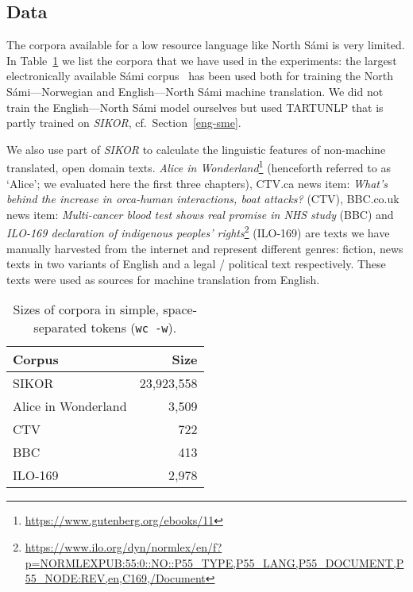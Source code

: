 \documentclass{flammie}
\begin{document}
\subsection{Data}

The corpora available for a low resource language like North Sámi is very
limited.  In Table~\ref{tab:corpus-sizes} we list the corpora that we have used
in the experiments: the largest electronically available Sámi
corpus~\cite{sikor_06.11.2018} has been used both for training the North
Sámi---Norwegian and English---North Sámi machine translation. We did not train
the English---North Sámi model ourselves but used TARTUNLP that is partly
trained on \textit{SIKOR}, cf.\ Section~\ref{eng-sme}.

We also use part of  \textit{SIKOR} to calculate the linguistic features of
non-machine translated, open domain texts. \textit{Alice in
Wonderland}\footnote{\url{https://www.gutenberg.org/ebooks/11}} (henceforth
referred to as `Alice'; we evaluated here the first three chapters), CTV.ca news
item: \textit{What's behind the increase in orca-human interactions, boat
attacks?} (CTV), BBC.co.uk news item: \textit{Multi-cancer blood test shows real
promise in NHS study} (BBC) and \textit{ILO-169 declaration of indigenous
peoples'
rights}\footnote{\url{https://www.ilo.org/dyn/normlex/en/f?p=NORMLEXPUB:55:0::NO::P55_TYPE,P55_LANG,P55_DOCUMENT,P55_NODE:REV,en,C169,/Document}}
(ILO-169) are texts we have manually harvested from the internet and represent
different genres: fiction, news texts in two variants of English and a legal /
political text respectively. These texts were used as sources for machine
translation from English.

\begin{table}[htb]
    \centering
    \begin{tabular}{lr}
    \toprule
         \bf Corpus & \bf Size \\



         \midrule
         SIKOR & 23,923,558 \\
         \midrule
         Alice in Wonderland & 3,509 \\
         CTV & 722 \\
         BBC & 413 \\
         ILO-169 & 2,978 \\
         \bottomrule
    \end{tabular}
    \caption{Sizes of corpora in simple, space-separated tokens (\texttt{wc
    -w}).\label{tab:corpus-sizes}}
\end{table}
\end{document}
